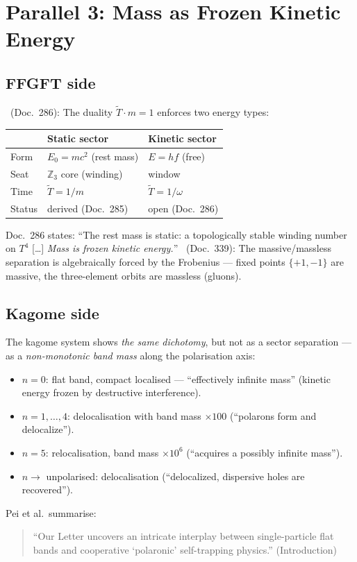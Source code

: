 \section{Parallel 3: Mass as Frozen Kinetic Energy}

\subsection{FFGFT side}

\BM\ (Doc.~286): The duality $\tilde{T}\cdot m=1$ enforces two energy types:
\begin{center}
\begin{tabular}{lll}
\toprule
 & Static sector & Kinetic sector \\
\midrule
Form        & $E_0=mc^2$ (rest mass)        & $E=hf$ (free) \\
Seat        & $\mathbb{Z}_3$ core (winding) & window \\
Time        & $\tilde{T}=1/m$               & $\tilde{T}=1/\omega$ \\
Status      & derived (Doc.~285)            & open (Doc.~286) \\
\bottomrule
\end{tabular}
\end{center}
Doc.~286 states: ``The rest mass is static: a topologically stable winding
number on $T^4$ [\ldots] \emph{Mass is frozen kinetic energy.}''
\BM\ (Doc.~339): The massive/massless separation is algebraically forced by
the Frobenius --- fixed points $\{+1,-1\}$ are massive, the three-element
orbits are massless (gluons).

\subsection{Kagome side}

The kagome system shows \emph{the same dichotomy}, but not as a sector
separation --- as a \emph{non-monotonic band mass} along the polarisation
axis:
\begin{itemize}
  \item $n=0$: flat band, compact localised --- ``effectively infinite mass''
        (kinetic energy frozen by destructive interference).
  \item $n=1,\ldots,4$: delocalisation with band mass $\times100$
        (``polarons form and delocalize'').
  \item $n=5$: relocalisation, band mass $\times10^6$ (``acquires a possibly
        infinite mass'').
  \item $n\to$ unpolarised: delocalisation (``delocalized, dispersive holes
        are recovered'').
\end{itemize}
Pei et al.\ summarise:
\begin{quote}\QM
``Our Letter uncovers an intricate interplay between single-particle flat
bands and cooperative `polaronic' self-trapping physics.'' (Introduction)
\end{quote}

